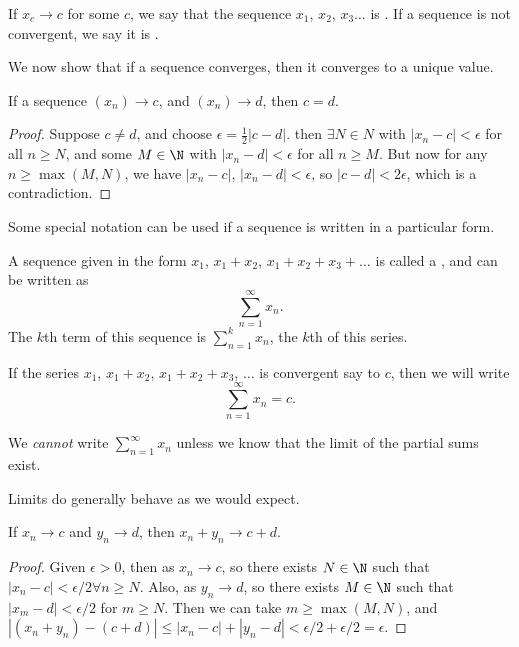 \documentclass[a4paper]{scrreprt}
\begin{document}
\begin{definition}
If $x_c \rightarrow c$ for some $c$, we say that the sequence $x_1$, $x_2$, $x_3 \dots$ is . If a sequence is not convergent, we say it is .
\end{definition}

We now show that if a sequence converges, then it converges to a unique value.

\begin{proposition}
If a sequence $(x_n) \rightarrow c$, and $(x_n) \rightarrow d$, then $c = d$.
\end{proposition}
\begin{proof}
	Suppose $c \neq d$, and choose $\epsilon = \frac{1}{2}|c - d|$. then $\exists N \in N$ with $|x_n - c| < \epsilon$ for all $n \geq N$, and some $M \in \N$ with $|x_n - d| < \epsilon$ for all $n \geq M$. But now for any $n \geq \max(M, N)$, we have $|x_n - c|$, $|x_n - d| < \epsilon$, so $|c - d| < 2 \epsilon$, which is a contradiction.
\end{proof}

Some special notation can be used if a sequence is written in a particular form.

\begin{definition}[Series]
	A sequence given in the form $x_1$, $x_1 + x_2$, $x_1 + x_2 + x_3 + \dots$ is called a , and can be written as
	$$
\sum_{n = 1}^\infty x_n.
	$$
	The $k$th term of this sequence is $\sum_{n = 1}^k x_n$, the $k$th  of this series.
\end{definition}

If the series $x_1$, $x_1 + x_2$, $x_1 + x_2 + x_3$, $\dots$ is convergent say to $c$, then we will write
$$
\sum_{n = 1}^{\infty} x_n = c.
$$
\begin{remark}[Warning]
	We \emph{cannot} write $\sum_{n = 1}^{\infty}x_n$ unless we know that the limit of the partial sums exist.
\end{remark}


Limits do generally behave as we would expect.

\begin{proposition}
	If $x_n \rightarrow c$ and $y_n \rightarrow d$, then $x_n + y_n \rightarrow c + d$.
\end{proposition}
\begin{proof}
	Given $\epsilon > 0$, then as $x_n \rightarrow c$, so there exists $N \in \N$ such that $|x_n - c| < \epsilon / 2 \forall n \geq N$. Also, as $y_n \rightarrow d$, so there exists $M \in \N$ such that $|x_m - d| < \epsilon / 2$ for $m \geq N$. Then we can take $m \geq \max(M, N)$, and $|(x_n + y_n) - (c + d)| \leq |x_n - c| + |y_n - d| < \epsilon/2 + \epsilon/2 = \epsilon$.
\end{proof}
\end{document}
